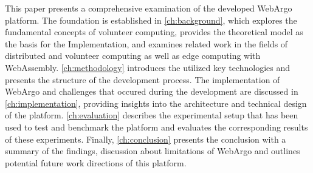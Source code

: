 This paper presents a comprehensive examination of the developed WebArgo platform. The foundation is established in \autoref{ch:background}, which explores the fundamental concepts of volunteer computing, provides the theoretical model as the basis for the Implementation, and examines related work in the fields of distributed and volunteer computing as well as edge computing with WebAssembly. \autoref{ch:methodology} introduces the utilized key technologies and presents the structure of the development process. The implementation of WebArgo and challenges that occured during the development are discussed in \autoref{ch:implementation}, providing insights into the architecture and technical design of the platform. \autoref{ch:evaluation} describes the experimental setup that has been used to test and benchmark the platform and evaluates the corresponding results of these experiments. Finally, \autoref{ch:conclusion} presents the conclusion with a summary of the findings, discussion about limitations of WebArgo and outlines potential future work directions of this platform.